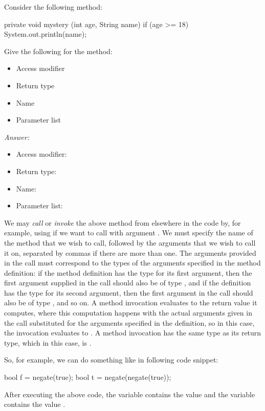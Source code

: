 \begin{example}
Consider the following method:
\begin{code}
private void mystery (int age, String name) {
  if (age >= 18) {
    System.out.println(name);
  }
}
\end{code} 
Give the following for the method:
\begin{itemize}
\item Access modifier
\item Return type
\item Name
\item Parameter list
\end{itemize}

\noindent \emph{Answer:}
\begin{itemize}
\item Access modifier: 
\item Return type: 
\item Name: 
\item Parameter list: 
\end{itemize}

\end{example}

We may \emph{call} or \emph{invoke} the above  method from elsewhere in the code by,
for example, using  if we want to call  with argument
.
We must specify the name of the method that we wish to call, followed by the arguments
that we wish to call it on, separated by commas if there are more than one.
The arguments provided in the call must correspond to the types of the arguments
specified in the method definition: if the method definition has the type 
for its first argument, then the first argument supplied in the call should also be
of type , and if the definition has the type  for its second argument,
then the first argument in the call should also be of type , and so on.
A method invocation evaluates to the return value it computes, where this
computation happens with the actual arguments
given in the call substituted for the arguments specified in the definition, so in
this case, the invocation  evaluates to .
A method invocation has the same type as its return type, which in this case, is .

So, for example, we can do something like in following code snippet:
\begin{code}
  bool f = negate(true);
  bool t = negate(negate(true));
\end{code}
After executing the above code, the variable  contains the value 
and the variable  contains the value .

